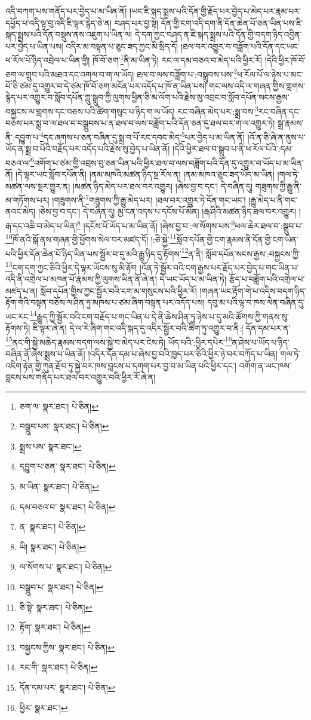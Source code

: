 འདི་བཀག་པས་གནོད་པར་བྱེད་པ་མ་ཡིན་ནོ། །ཡང་ཇི་སྐད་སྨྲས་པའི་དོན་གྱི་རྗོད་པར་བྱེད་པ་མེད་པར་རྣམ་པར་དཔྱོད་པ་འདི་ལྟ་བུ་འདི་ཇི་ལྟར་རྙེད་ཅེ་ན། བཤད་པར་བྱ་སྟེ། དོན་གྱི་ངག་འདི་དག་ནི་དོན་ཆེན་པོ་ཅན་ཡིན་པས་ཇི་སྐད་སྨྲས་པའི་དོན་བསྡུས་ནས་འཇུག་པ་ཡིན་ལ། དེ་དག་ཀྱང་བཤད་ན་ཇི་སྐད་སྨྲས་པའི་དོན་གྱི་བདག་ཉིད་འབྱིན་པར་བྱེད་པ་ཡིན་པས། འདིར་མ་བསྟན་པ་ཅུང་ཟད་ཀྱང་མི་སྲིད་དོ། །ཐལ་བར་འགྱུར་བ་བཟློག་པའི་དོན་དང་ཡང་ཕ་རོལ་པོ་ཉིད་འབྲེལ་པ་ཡིན་གྱི། ཁོ་བོ་ཅག་\footnote{ཅག་ལ་  སྣར་ཐང་།  པེ་ཅིན། }ནི་མ་ཡིན་ཏེ། རང་ལ་དམ་བཅའ་བ་མེད་པའི་ཕྱིར་རོ། །དེའི་ཕྱིར་ཁོ་བོ་ཅག་ལ་གྲུབ་པའི་མཐའ་དང་འགལ་བ་ག་ལ་ཡོད། ཐལ་བ་ལས་བཟློག་པ་:བསྒྲུབས་པས་\footnote{བསྒྲུབ་པས་  སྣར་ཐང་།  པེ་ཅིན། }ཕ་རོལ་པོ་ལ་ཉེས་པ་མང་པོ་ཅི་ཙམ་དུ་འགྱུར་བ་དེ་ཙམ་ཁོ་བོ་ཅག་མངོན་པར་འདོད་པ་ཁོ་ན་ཡིན་པས། གང་ལས་འདི་ལ་གཞན་གྱིས་གླགས་རྙེད་པར་འགྱུར་བ་སློབ་དཔོན་ཀླུ་སྒྲུབ་ཀྱི་ལུགས་ཕྱིན་ཅི་མ་ལོག་པའི་རྗེས་སུ་འབྲང་བ་སློབ་དཔོན་སངས་རྒྱས་བསྐྱངས་ལ་གླགས་དང་བཅས་པའི་ཚིག་གསུང་པ་ཉིད་ག་ལ་ཡོད། རང་བཞིན་མེད་པར་:སྨྲ་བས་\footnote{སྨྲས་པས་  སྣར་ཐང་། }རང་བཞིན་དང་བཅས་པར་སྨྲ་བ་ལ་ཐལ་བ་བསྒྲུབས་པ་ན་ཐལ་བ་ལས་བཟློག་པའི་དོན་ཅན་དུ་ཐལ་བར་ག་ལ་འགྱུར་ཏེ། སྒྲ་རྣམས་ནི་:དབྱུག་པ་\footnote{དབྱུག་པ་ཅན་  སྣར་ཐང་།  པེ་ཅིན། }དང་ཞགས་པ་ཅན་བཞིན་དུ་སྨྲ་བ་པོ་རང་དབང་མེད་\footnote{མ་ཡིན་  སྣར་ཐང་།  པེ་ཅིན། }པར་བྱེད་པ་མ་ཡིན་ནོ། །འོ་ན་ཅི་ཞེ་ན་ནུས་པ་ཡོད་ན་སྨྲ་བ་པོའི་བརྗོད་པར་འདོད་པའི་རྗེས་སུ་བྱེད་པ་ཡིན་ནོ། །དེའི་ཕྱིར་ཐལ་བ་སྒྲུབ་པ་ནི་ཕ་རོལ་པོའི་:དམ་བཅའ་ལ་\footnote{དམ་བཅའ་བ་  སྣར་ཐང་།  པེ་ཅིན། }འགོག་པ་ཙམ་གྱི་འབྲས་བུ་ཅན་ཡིན་པའི་ཕྱིར་ཐལ་བ་ལས་བཟློག་པའི་དོན་དུ་འགྱུར་བ་ཡོད་པ་མ་ཡིན་ནོ། །དེ་ལྟར་ཡང་སློབ་དཔོན་ནི། །ནམ་མཁའི་མཚན་ཉིད་སྔ་རོལ་ན། །ནམ་མཁའ་ཅུང་ཟད་ཡོད་མ་ཡིན། །གལ་ཏེ་མཚན་ལས་སྔར་གྱུར་ན། །མཚན་ཉིད་མེད་པར་ཐལ་བར་འགྱུར། །ཞེས་བྱ་བ་དང་། དེ་བཞིན་དུ། གཟུགས་ཀྱི་རྒྱུ་ནི་མ་གཏོགས་པར། །གཟུགས་ནི་\footnote{ན་  སྣར་ཐང་།  པེ་ཅིན། }གཟུགས་ཀྱི་རྒྱུ་མེད་པར། །ཐལ་བར་འགྱུར་ཏེ་དོན་གང་ཡང་། །རྒྱུ་མེད་པ་ནི་གང་ནའང་མེད། །ཅེས་བྱ་བ་དང་། དེ་བཞིན་དུ། མྱ་ངན་འདས་པ་དངོས་པོ་མིན། །རྒ་ཤིའི་མཚན་ཉིད་ཐལ་བར་འགྱུར། །རྒ་དང་འཆི་བ་མེད་པ་ཡིན།\footnote{ཡི།  སྣར་ཐང་།  པེ་ཅིན། } །དངོས་པོ་ཡོད་པ་མ་ཡིན་ནོ། །ཞེས་བྱ་བ་:ལ་སོགས་པས་\footnote{ལ་སོགས་པ་  སྣར་ཐང་།  པེ་ཅིན། }ཕལ་ཆེར་ཐལ་བ་:སྒྲུབ་པ་\footnote{བསྒྲུབ་པ་  སྣར་ཐང་།  པེ་ཅིན། }ཁོ་ནའི་སྒོ་ནས་གཞན་གྱི་ཕྱོགས་སེལ་བར་མཛད་དོ། །:ཅི་སྐྱེ་\footnote{ཅི་སྟེ་  སྣར་ཐང་།  པེ་ཅིན། }སློབ་དཔོན་གྱི་ངག་རྣམས་ནི་དོན་གྱི་ངག་ཡིན་པའི་ཕྱིར་དོན་ཆེན་པོ་ཉིད་ཡིན་པས་སྦྱོར་བ་དུ་མའི་རྒྱུ་ཉིད་དུ་རྟོགས་\footnote{རྟོག་  སྣར་ཐང་།  པེ་ཅིན། }ན་ནི། སློབ་དཔོན་སངས་རྒྱས་:བསྐྱངས་ཀྱི་\footnote{བསྐྱངས་ཀྱིས་  སྣར་ཐང་།  པེ་ཅིན། }ངག་དག་ཀྱང་ཅིའི་ཕྱིར་དེ་ལྟར་ཡོངས་སུ་མི་རྟོག །འོན་ཏེ་སྦྱོར་བའི་ངག་རྒྱས་པར་རྗོད་པར་བྱེད་པ་གང་ཡིན་པ་འདི་ནི་འགྲེལ་པ་མཁན་པོ་རྣམས་ཀྱི་ལུགས་ཡིན་ནོ་ཞེ་ན། དེ་ཡང་ཡོད་པ་མ་ཡིན་ཏེ། རྩོད་པ་བཟློག་པའི་འགྲེལ་པ་མཛད་པ་ན། སློབ་དཔོན་གྱིས་ཀྱང་སྦྱོར་བའི་ངག་མ་གསུངས་པའི་ཕྱིར་རོ། །གཞན་ཡང་རྟོག་གེ་པ་འདིས་བདག་ཉིད་རྟོག་གེའི་བསྟན་བཅོས་ལ་ཤིན་ཏུ་མཁས་པ་ཙམ་ཞིག་བསྟན་པར་འདོད་པས། དབུ་མ་པའི་ལྟ་བ་ཁས་ལེན་བཞིན་དུ་ཡང་རང་\footnote{རང་གི་  སྣར་ཐང་།  པེ་ཅིན། }རྒྱུད་ཀྱི་སྦྱོར་བའི་ངག་བརྗོད་པ་གང་ཡིན་པ་དེ་ནི་ཆེས་ཤིན་ཏུ་ཉེས་པ་དུ་མའི་ཚོགས་ཀྱི་གནས་སུ་རྟོགས་ཏེ། ཇི་ལྟར་ཞེ་ན། དེ་ལ་རེ་ཞིག་གང་འདི་སྐད་དུ་འདིར་སྦྱོར་བའི་ཚིག་ཏུ་འགྱུར་བ་ནི:། དོན་དམ་པར་ན་\footnote{དོན་དམ་པར་  སྣར་ཐང་།  པེ་ཅིན། }ནང་གི་སྐྱེ་མཆེད་རྣམས་བདག་ལས་སྐྱེ་བ་མེད་པར་ངེས་ཏེ། ཡོད་པའི་:ཕྱིར་དཔེར་\footnote{ཕྱིར་  སྣར་ཐང་། }ན་ཤེས་པ་ཡོད་པ་ཉིད་བཞིན་ནོ་ཞེས་སྨྲས་པ་ཡིན་ནོ། །འདིར་དོན་དམ་པ་ཞེས་བྱ་བའི་ཁྱད་པར་ཅིའི་ཕྱིར་ཉེ་བར་བཀོད་པ་ཡིན། གལ་ཏེ་འཇིག་རྟེན་གྱི་ཀུན་རྫོབ་ཏུ་སྐྱེ་བར་ཁས་བླངས་པ་དགག་པར་བྱ་བ་མ་ཡིན་པའི་ཕྱིར་དང་། འགོག་ན་ཡང་ཁས་བླངས་པས་གནོད་པར་ཐལ་བར་འགྱུར་བའི་ཕྱིར་རོ་ཞེ་ན། 